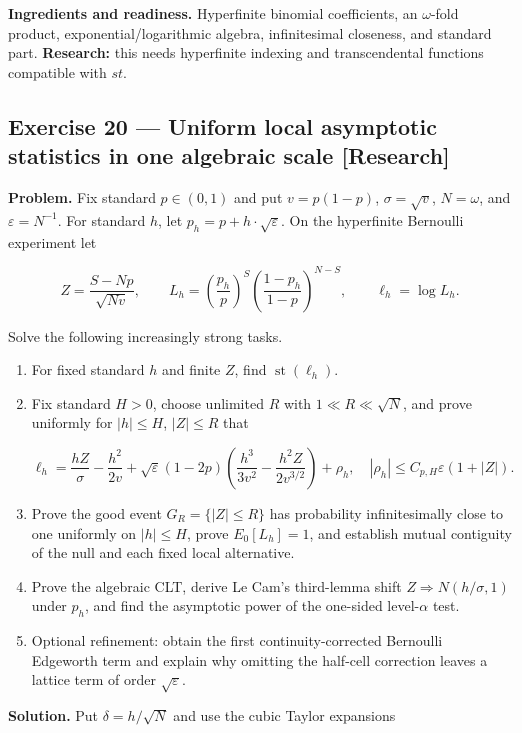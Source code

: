 \documentclass[11pt]{article}
\newcommand{\eps}{\varepsilon}
\renewcommand{\epsilon}{\varepsilon}
\newcommand{\st}{\operatorname{st}}
\begin{document}
\textbf{Ingredients and readiness.} Hyperfinite binomial coefficients, an
$\omega$-fold product, exponential/logarithmic algebra, infinitesimal
closeness, and standard part. \textbf{Research:} this needs hyperfinite indexing and
transcendental functions compatible with $st$.


\subsection*{Exercise 20 --- Uniform local asymptotic statistics in one algebraic scale \hfill \normalfont\small[Research]}

\textbf{Problem.} Fix standard $p\in (0,1)$ and put
$v=p(1-p)$, $\sigma=\sqrt{v}$, $N=\omega$, and $\eps=N^{-1}$. For standard
$h$, let $p_h=p+h\cdot \sqrt{\eps}$. On the hyperfinite Bernoulli experiment let

\[
Z=\frac{S-Np}{\sqrt{Nv}},\qquad
L_h=\left(\frac{p_h}{p}\right)^S
    \left(\frac{1-p_h}{1-p}\right)^{N-S},\qquad
\ell_h=\log L_h.
\]

Solve the following increasingly strong tasks.

\begin{enumerate}[leftmargin=*]
\item For fixed standard $h$ and finite $Z$, find $\st(\ell_h)$.
\item Fix standard $H>0$, choose unlimited $R$ with
   $1 \ll  R \ll  \sqrt{N}$, and prove uniformly for $|h|\le H$, $|Z|\le R$ that

   \[
   \ell_h=\frac{hZ}{\sigma}-\frac{h^2}{2v}
   +\sqrt\epsilon(1-2p)
      \left(\frac{h^3}{3v^2}-\frac{h^2Z}{2v^{3/2}}\right)
   +\rho_h,
   \quad |\rho_h|\le C_{p,H}\epsilon(1+|Z|).
   \]

\item Prove the good event $G_R=\{|Z|\le R\}$ has probability infinitesimally
   close to one uniformly on $|h|\le H$, prove $E_0[L_h]=1$, and establish
   mutual contiguity of the null and each fixed local alternative.
\item Prove the algebraic CLT, derive Le Cam's third-lemma shift
   $Z \Rightarrow  N(h/\sigma,1)$ under $p_{h}$, and find the asymptotic power of the
   one-sided level-$\alpha$ test.
\item Optional refinement: obtain the first continuity-corrected Bernoulli
   Edgeworth term and explain why omitting the half-cell correction leaves a
   lattice term of order $\sqrt{\eps}$.
\end{enumerate}

\textbf{Solution.} Put $\delta=h/\sqrt{N}$ and use the cubic Taylor expansions
\end{document}
